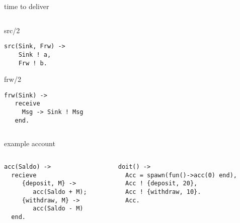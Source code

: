 \begin{frame}[fragile]{time to deliver}

\begin{columns}
   \begin{column}{.5\linewidth}
     \begin{block}{src/2}
\begin{verbatim}
src(Sink, Frw) ->
    Sink ! a,
    Frw ! b.
\end{verbatim}
      \end{block}
     \begin{block}{frw/2}
\begin{verbatim}
frw(Sink) -> 
   receive 
     Msg -> Sink ! Msg
   end.
\end{verbatim}
      \end{block}
    \end{column}
\pause
    \begin{column}{.5\linewidth}
    \end{column}

  \end{columns}


\end{frame}
 
\begin{frame}[fragile]{example account}

\begin{columns}
   \begin{column}{.5\linewidth}
     \begin{verbatim}
acc(Saldo) ->
  recieve
     {deposit, M} ->
        acc(Saldo + M);
     {withdraw, M} ->
        acc(Saldo - M)
  end.
     \end{verbatim}
   \end{column}
\pause
  \begin{column}{.5\linewidth}
     \begin{verbatim}
doit() ->
  Acc = spawn(fun()->acc(0) end),
  Acc ! {deposit, 20},
  Acc ! {withdraw, 10}.
  Acc.
     \end{verbatim}
   \end{column}
\end{columns}


\end{frame}

